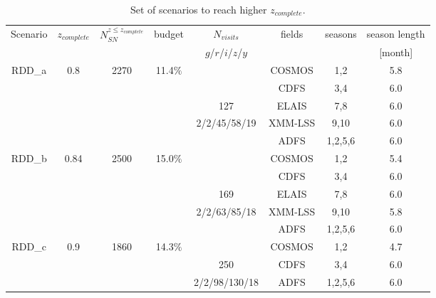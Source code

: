 \documentclass[\docopts]{\docclass}
\newcommand{\bg}{{$g$}}
\newcommand{\br}{{$r$}}
\newcommand{\bi}{{$i$}}
\newcommand{\bz}{{$z$}}
\newcommand{\by}{{$y$}}
\newcommand{\nsncomp}{{$N_{SN}^{z\leq z_{complete}}$}}
\newcommand{\zcomp}{\mbox{$z_{complete}$}}
\newcommand{\per}{$\%$}
\newcommand{\nvisits}{$N_{visits}$}
\newcommand{\ddfscen}[1]{RDD\_#1}
\begin{document}
\begin{table}[!htbp]
  \caption{Set of scenarios to reach higher \zcomp.}\label{tab:rolling_scenarios}
  \begin{center}
    \begin{tabular}{c|c|c|c|c|c|c|c}
      \hline
      \hline
      Scenario & \zcomp & \nsncomp & budget & \nvisits & fields & seasons & season length\\
                       &                 &                     &               & \bg/\br/\bi/\bz/\by &        & & [month] \\
      \hline
      \multirow{5}{*}{\ddfscen{a}} & \multirow{5}{*}{0.8} & \multirow{5}{*}{2270} & \multirow{5}{*}{11.4\per} & & COSMOS & 1,2 & 5.8 \\
         &       &          &                  &          & CDFS         & 3,4 & 6.0 \\
         &       &          &                  &      127               & ELAIS        & 7,8 & 6.0 \\
         &       &          &                  &    2/2/45/58/19                  &XMM-LSS  & 9,10 & 6.0 \\
         &       &          &                  &                     &ADFS          & 1,2,5,6 & 6.0 \\
      \hline
      \multirow{5}{*}{\ddfscen{b}} & \multirow{5}{*}{0.84} & \multirow{5}{*}{2500} & \multirow{5}{*}{15.0\per} & & COSMOS & 1,2 & 5.4\\
         &       &          &                  &          & CDFS         & 3,4 & 6.0 \\
         &       &          &                  &      169               & ELAIS        & 7,8 & 6.0 \\
         &       &          &                  &    2/2/63/85/18                  &XMM-LSS  & 9,10 & 5.8\\
         &       &          &                  &                     &ADFS          & 1,2,5,6 & 6.0 \\
      \hline
      \multirow{3}{*}{\ddfscen{c}} & \multirow{3}{*}{0.9} & \multirow{3}{*}{1860} & \multirow{3}{*}{14.3\per} & & COSMOS & 1,2 & 4.7 \\
         &       &          &                  &     250     & CDFS         & 3,4 & 6.0 \\
         &       &          &                  &    2/2/98/130/18                 &ADFS          & 1,2,5,6 & 6.0 \\
      \hline
      \end{tabular}
  \end{center}
\end{table}
\end{document}
